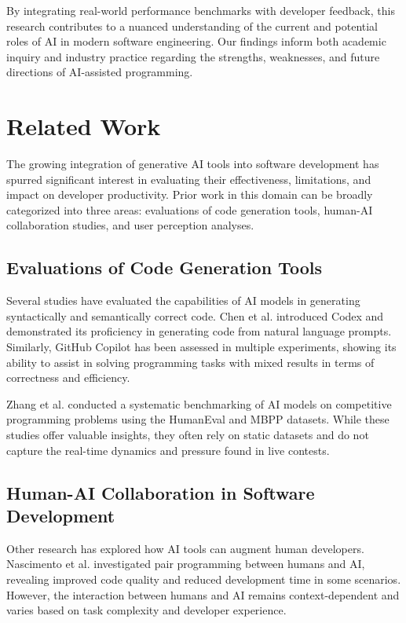 \documentclass[conference]{IEEEtran}
\begin{document}
By integrating real-world performance benchmarks with developer feedback, this research contributes to a nuanced understanding of the current and potential roles of AI in modern software engineering. Our findings inform both academic inquiry and industry practice regarding the strengths, weaknesses, and future directions of AI-assisted programming.


\section{Related Work}

The growing integration of generative AI tools into software development has spurred significant interest in evaluating their effectiveness, limitations, and impact on developer productivity. Prior work in this domain can be broadly categorized into three areas: evaluations of code generation tools, human-AI collaboration studies, and user perception analyses.

\subsection{Evaluations of Code Generation Tools}

Several studies have evaluated the capabilities of AI models in generating syntactically and semantically correct code. Chen et al. introduced Codex and demonstrated its proficiency in generating code from natural language prompts. Similarly, GitHub Copilot has been assessed in multiple experiments, showing its ability to assist in solving programming tasks with mixed results in terms of correctness and efficiency.

Zhang et al. conducted a systematic benchmarking of AI models on competitive programming problems using the HumanEval and MBPP datasets. While these studies offer valuable insights, they often rely on static datasets and do not capture the real-time dynamics and pressure found in live contests.

\subsection{Human-AI Collaboration in Software Development}

Other research has explored how AI tools can augment human developers. Nascimento et al. investigated pair programming between humans and AI, revealing improved code quality and reduced development time in some scenarios. However, the interaction between humans and AI remains context-dependent and varies based on task complexity and developer experience.
\end{document}

